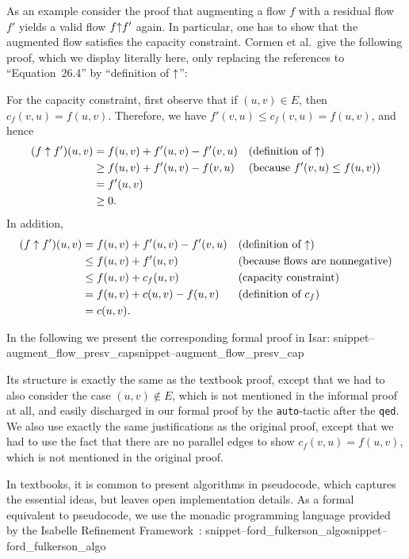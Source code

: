 \documentclass{llncs}
\newcommand{\isai}{\lstinline[language=isabelle,basicstyle=\normalsize\ttfamily\slshape]}
\newcommand{\Snippet}[1]{\ifcsname snippet--#1\endcsname\csname snippet--#1\endcsname\else\PackageError{}{No snippet '#1' defined.}{}\fi}
\begin{document}
As an example consider the proof that augmenting a flow $f$ with a residual flow $f'$ yields a valid flow $f{\mathbin\uparrow} f'$ again. In particular, one has to show 
that the augmented flow satisfies the capacity constraint. Cormen et al.~give the following proof, which we display literally here, only replacing the references to 
``Equation~26.4'' by ``definition of ${\mathbin\uparrow}$'':

For the capacity constraint, first observe that if $(u, v) \in E$, then $c_f(v, u) = f(u, v)$. Therefore, we have $f'(v,u) \leq c_f(v, u) = f(u, v)$, and hence
	\begin{align*}
	(f \uparrow f') (u, v) &= f(u, v) + f'(u, v) - f'(v, u)  && \text{(definition of ${\mathbin\uparrow}$)} \\
	& \geq f(u, v) + f'(u, v) - f(v, u) && \text{(because $f'(v,u) \leq f(u, v)$)} \\
	& = f'(u, v) \\
	& \geq 0.
	\end{align*}
In addition,
	\begin{align*}
	(f \uparrow f') (u, v) &= f(u, v) + f'(u, v) - f'(v, u)  && \text{(definition of ${\mathbin\uparrow}$)} \\
	& \leq f(u, v) + f'(u, v) && \text{(because flows are nonnegative)} \\
	& \leq f(u, v) + c_f(u, v) &&  \text{(capacity constraint)} \\
	& = f(u, v) + c(u, v) - f(u, v) && \text{(definition of $c_f$)} \\
	& = c (u, v).
	\end{align*}

In the following we present the corresponding formal proof in Isar:
\Snippet{augment_flow_presv_cap}
Its structure is exactly the same as the textbook proof, except that we had to also consider the case $(u,v)\notin E$, which is not mentioned in the informal proof at all, and easily discharged in our formal proof by the \isai{auto}-tactic after the \isai{qed}. We also use exactly the same justifications as the original proof, except that we had to use the fact that there are no parallel edges to show $c_f(v,u)=f(u,v)$, which is not mentioned in the original proof.

In textbooks, it is common to present algorithms in pseudocode, which captures the essential ideas, but leaves open implementation details. As a formal equivalent to pseudocode, we use the monadic programming language provided by the Isabelle Refinement Framework~\cite{LaTu12,La12}:
\Snippet{ford_fulkerson_algo}
\end{document}
